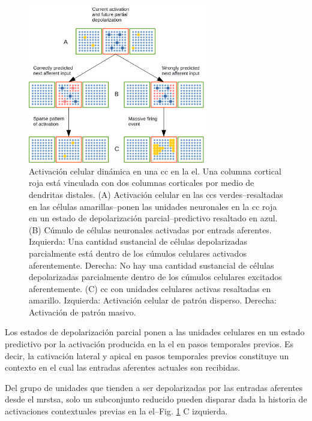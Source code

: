{\begin{figure}[h!]
    \centering
    \includegraphics[width=0.7\textwidth]{Activation.png}
    \caption{Activación celular dinámica en una \gls{cc} en la \gls{el}.
	    Una columna cortical roja está vinculada con dos columnas corticales por medio de dendritas distales.
	    (A) Activación celular en las \glspl{cc} verdes--resaltadas en las células amarillas--ponen las unidades neuronales
	    en la \gls{cc} roja en un estado de depolarización parcial--predictivo resaltado en azul.
	    (B) Cúmulo de células neuronales activadas por entrads aferentes.
	    Izquierda: Una cantidad sustancial de células depolarizadas parcialmente está dentro de los cúmulos celulares activados aferentemente.
	    Derecha: No hay una cantidad sustancial de células depolarizadas parcialmente dentro de los cúmulos celulares excitados aferentemente.
	    (C) \gls{cc} con unidades celulares activas resaltadas en amarillo.
	    Izquierda: Activación celular de patrón disperso.
	    Derecha: Activación de patrón masivo.}
    \label{fig:Activation}
\end{figure}

Los estados de depolarización parcial ponen a las unidades celulares en un estado predictivo por
la activación producida en la \gls{el} en pasos temporales previos.
Es decir, la cativación lateral y apical en pasos temporales previos constituye un contexto en el cual
las entradas aferentes actuales son recibidas.

Del grupo de unidades que tienden a ser depolarizadas por las entradas aferentes desde el \gls{mrstsa},
solo un subconjunto reducido pueden disparar dada la historia de activaciones contextuales previas
en la  \gls{el}--Fig. \ref{fig:Activation} C izquierda.

}
